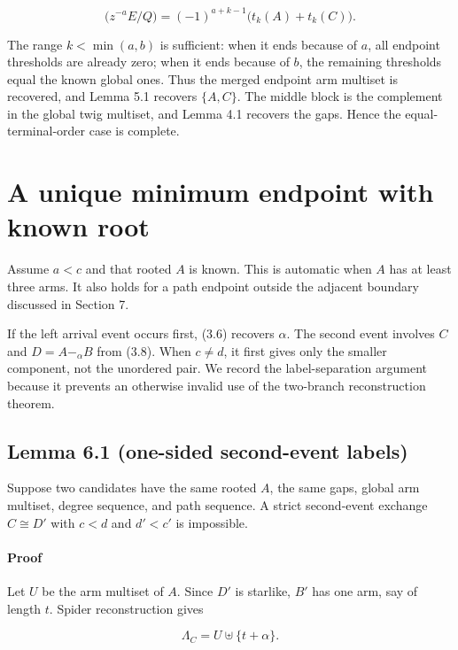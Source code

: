 \documentclass[11pt]{article}
\begin{document}
\begin{equation*}
[p_ap_k][z^k]\bigl(z^{-a}E/Q\bigr)
=(-1)^{a+k-1}\bigl(t_k(A)+t_k(C)\bigr).
\tag{5.7}
\end{equation*}


The range $k<\min(a,b)$ is sufficient: when it ends because of $a$, all endpoint thresholds are
already zero; when it ends because of $b$, the remaining thresholds equal the known global ones.
Thus the merged endpoint arm multiset is recovered, and Lemma 5.1 recovers $\{A,C\}$. The middle
block is the complement in the global twig multiset, and Lemma 4.1 recovers the gaps. Hence the
equal-terminal-order case is complete.

\section{A unique minimum endpoint with known root}


Assume $a<c$ and that rooted $A$ is known. This is automatic when $A$ has at least three arms. It
also holds for a path endpoint outside the adjacent boundary discussed in Section 7.

If the left arrival event occurs first, (3.6) recovers $\alpha$. The second event involves $C$ and
$D=A\mathbin{-}_\alpha B$ from (3.8). When $c\neq d$, it first gives only the smaller component,
not the unordered pair. We record the label-separation argument because it prevents an otherwise
invalid use of the two-branch reconstruction theorem.

\Needspace{0.13\textheight}
\subsection*{Lemma 6.1 (one-sided second-event labels)}


Suppose two candidates have the same rooted $A$, the same gaps, global arm multiset, degree
sequence, and path sequence. A strict second-event exchange $C\cong D'$ with $c<d$ and $d'<c'$
is impossible.

\paragraph{Proof}


Let $U$ be the arm multiset of $A$. Since $D'$ is starlike, $B'$ has one arm, say of length $t$.
Spider reconstruction gives

\begin{equation*}
\Lambda_C=U\mathbin{\uplus}\{t+\alpha\}.
\tag{6.1}
\end{equation*}
\end{document}
